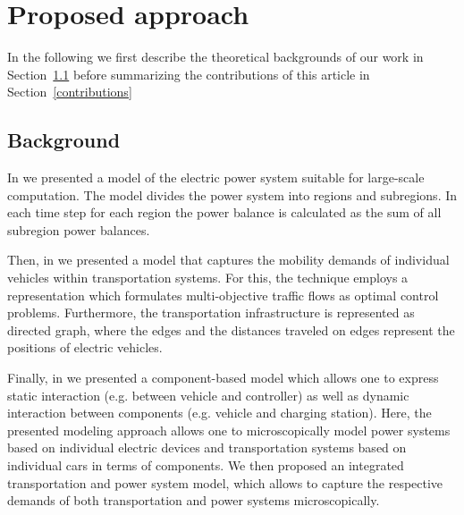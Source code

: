 \section{Proposed approach}
\label{proposed_work}

In the following we first describe the theoretical backgrounds of our work in Section~\ref{backgrounds} before summarizing the contributions of this article in Section~\ref{contributions}

\subsection{Background}
\label{backgrounds}





In \cite{Hackenberg2012} we presented a model of the electric power system suitable for large-scale computation. The model divides the power system into regions and subregions. In each time step for each region the power balance is calculated as the sum of all subregion power balances.

Then, in \cite{ascher2014early} we presented a model that captures the mobility demands of individual vehicles within transportation systems. For this, the technique employs a representation which formulates multi-objective traffic flows as optimal control problems. Furthermore, the transportation infrastructure is represented as directed graph, where the edges and the distances traveled on edges represent the positions of electric vehicles.

Finally, in \cite{ascher2015integrated} we presented a component-based model which allows one to express static interaction (e.g. between vehicle and controller) as well as dynamic interaction between components (e.g. vehicle and charging station). Here, the presented modeling approach allows one to microscopically model power systems based on individual electric devices and transportation systems based on individual cars in terms of components. We then proposed an integrated transportation and power system model, which allows to capture the respective demands of both transportation and power systems microscopically.

